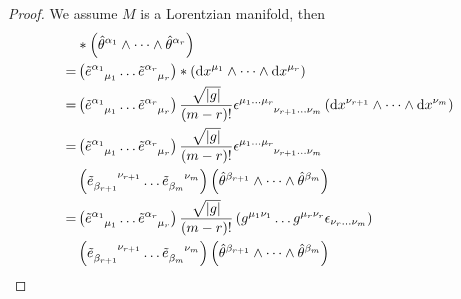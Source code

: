 \documentclass[10pt]{article}
\begin{document}
\begin{proof}
    We assume $M$ is a Lorentzian manifold, then
    \begin{align}
          & \ast\left(\hat{\theta}^{\alpha_1}\wedge\dots\wedge\hat{\theta}^{\alpha_r}\right)\notag                                                                                                                                                                                                                                                       \\
        = & \left(\tensor{\tilde{e}}{^{\alpha_1}_{\mu_1}}\dots\tensor{\tilde{e}}{^{\alpha_r}_{\mu_r}}\right)\ast\left(\dd{x^{\mu_1}}\wedge\dots\wedge\dd{x^{\mu_r}}\right)\notag                                                                                                                                                                         \\
        = & \left(\tensor{\tilde{e}}{^{\alpha_1}_{\mu_1}}\dots\tensor{\tilde{e}}{^{\alpha_r}_{\mu_r}}\right)\frac{\sqrt{\abs{g}}}{(m-r)!}\tensor{\epsilon}{^{\mu_1\dots\mu_r}_{\nu_{r+1}\dots\nu_{m}}}\left(\dd{x^{\nu_{r+1}}}\wedge\dots\wedge\dd{x^{\nu_m}}\right)\notag                                                                               \\
        = & \left(\tensor{\tilde{e}}{^{\alpha_1}_{\mu_1}}\dots\tensor{\tilde{e}}{^{\alpha_r}_{\mu_r}}\right)\frac{\sqrt{\abs{g}}}{(m-r)!}\tensor{\epsilon}{^{\mu_1\dots\mu_r}_{\nu_{r+1}\dots\nu_{m}}}\notag                                                                                                                                             \\
          & \left(\tensor{\tilde{e}}{_{\beta_{r+1}}^{\nu_{r+1}}}\dots\tensor{\tilde{e}}{_{\beta_{m}}^{\nu_m}}\right)\left(\hat{\theta}^{\beta_{r+1}}\wedge\dots\wedge\hat{\theta}^{\beta_m}\right)\notag                                                                                                                                                 \\
        = & \left(\tensor{\tilde{e}}{^{\alpha_1}_{\mu_1}}\dots\tensor{\tilde{e}}{^{\alpha_r}_{\mu_r}}\right)\frac{\sqrt{\abs{g}}}{(m-r)!}\left(g^{\mu_1\nu_1}\dots g^{\mu_r \nu_r}\epsilon_{\nu_r\dots\nu_m}\right)\notag                                                                                                                                \\
          & \left(\tensor{\tilde{e}}{_{\beta_{r+1}}^{\nu_{r+1}}}\dots\tensor{\tilde{e}}{_{\beta_{m}}^{\nu_m}}\right)\left(\hat{\theta}^{\beta_{r+1}}\wedge\dots\wedge\hat{\theta}^{\beta_m}\right)\notag                                                                                                                                                 \\

\end{align}
\end{proof}
\end{document}
